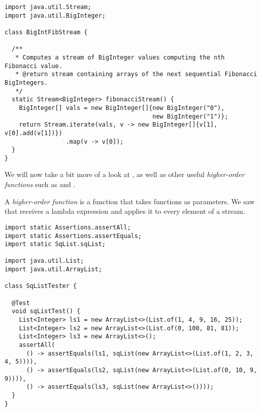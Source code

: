 \begin{cl}[]{}
\begin{lstlisting}[language=MyJava]
import java.util.Stream;
import java.util.BigInteger;

class BigIntFibStream {

  /**
   * Computes a stream of BigInteger values computing the nth Fibonacci value.
   * @return stream containing arrays of the next sequential Fibonacci BigIntegers.
   */
  static Stream<BigInteger> fibonacciStream() {
    BigInteger[] vals = new BigInteger[]{new BigInteger("0"),
                                         new BigInteger("1")};
    return Stream.iterate(vals, v -> new BigInteger[]{v[1], v[0].add(v[1])})
                 .map(v -> v[0]);
  }
}
\end{lstlisting}
\end{cl}

We will now take a bit more of a look at , as well as other useful \textit{higher-order functions} such as  and .

A \textit{higher-order function} is a function that takes functions as parameters. We saw that  receives a lambda expression and applies it to every element of a stream. 


\begin{cl}[]{}
\begin{lstlisting}[language=MyJava]
import static Assertions.assertAll;
import static Assertions.assertEquals;
import static SqList.sqList;

import java.util.List;
import java.util.ArrayList;

class SqListTester {

  @Test
  void sqListTest() {
    List<Integer> ls1 = new ArrayList<>(List.of(1, 4, 9, 16, 25));
    List<Integer> ls2 = new ArrayList<>(List.of(0, 100, 81, 81));
    List<Integer> ls3 = new ArrayList<>();
    assertAll(
      () -> assertEquals(ls1, sqList(new ArrayList<>(List.of(1, 2, 3, 4, 5)))),
      () -> assertEquals(ls2, sqList(new ArrayList<>(List.of(0, 10, 9, 9)))),
      () -> assertEquals(ls3, sqList(new ArrayList<>())));
  }
}
\end{lstlisting}    
\end{cl}

